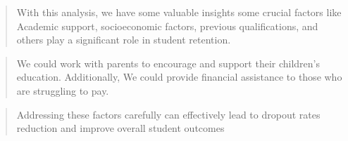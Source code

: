 \documentclass[
  letterpaper,
  DIV=11,
  numbers=noendperiod]{scrartcl}
\begin{document}
\begin{quote}
With this analysis, we have some valuable insights some crucial factors
like Academic support, socioeconomic factors, previous qualifications,
and others play a significant role in student retention.
\end{quote}

\begin{quote}
We could work with parents to encourage and support their children's
education. Additionally, We could provide financial assistance to those
who are struggling to pay.
\end{quote}

\begin{quote}
Addressing these factors carefully can effectively lead to dropout rates
reduction and improve overall student outcomes
\end{quote}


\printbibliography
\end{document}

